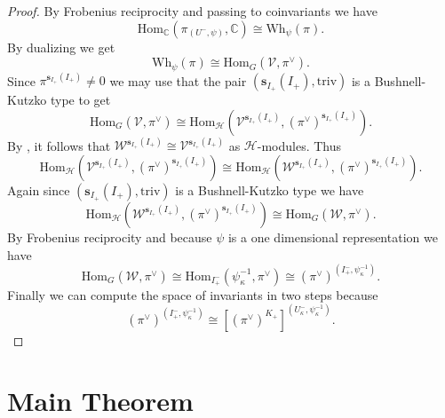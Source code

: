 \documentclass[11pt]{amsart}
\theoremstyle{plain}
\theoremstyle{definition}
\numberwithin{equation}{section}
\newcommand{\C}{\mathbb{C}}
\newcommand{\s}{\mathbf{s}}
\newcommand{\Hcal}{\mathcal{H}}
\begin{document}
\begin{proof}
    By Frobenius reciprocity and passing to coinvariants we have
    \begin{equation*}
        \mathrm{Hom}_{\C}(\pi_{(U^{-},\psi)},\C)\cong \mathrm{Wh}_{\psi}(\pi).
    \end{equation*}
    By dualizing we get
    \begin{equation*}
        \mathrm{Wh}_{\psi}(\pi)\cong \mathrm{Hom}_{G}(\mathcal{V},\pi^{\vee}).
    \end{equation*}
    Since $\pi^{\s_{I_{+}}(I_{+})}\neq 0$ we may use that the pair $(\s_{I_{+}}(I_{+}),\mathrm{triv})$ is a Bushnell-Kutzko type \cite[Lemma 5.8]{GGK24} to get
    \begin{equation*}
        \mathrm{Hom}_{G}(\mathcal{V},\pi^{\vee})\cong \mathrm{Hom}_{\Hcal}(\mathcal{V}^{\s_{I_{+}}(I_{+})},(\pi^{\vee})^{\s_{I_{+}}(I_{+})}).
    \end{equation*}
    By \cite[Lemmas 5.1-5.3]{GGK24}, it follows that $\mathcal{W}^{\s_{I_{+}}(I_{+})}\cong \mathcal{V}^{\s_{I_{+}}(I_{+})}$ as $\Hcal$-modules. Thus 
    \begin{equation*}
        \mathrm{Hom}_{\Hcal}(\mathcal{V}^{\s_{I_{+}}(I_{+})},(\pi^{\vee})^{\s_{I_{+}}(I_{+})})\cong \mathrm{Hom}_{\Hcal}(\mathcal{W}^{\s_{I_{+}}(I_{+})},(\pi^{\vee})^{\s_{I_{+}}(I_{+})}).
    \end{equation*}
    Again since $(\s_{I_{+}}(I_{+}),\mathrm{triv})$ is a Bushnell-Kutzko type we have 
    \begin{equation*}
        \mathrm{Hom}_{\Hcal}(\mathcal{W}^{\s_{I_{+}}(I_{+})},(\pi^{\vee})^{\s_{I_{+}}(I_{+})})\cong \mathrm{Hom}_{G}(\mathcal{W},\pi^{\vee}).
    \end{equation*}
    By Frobenius reciprocity and because $\psi$ is a one dimensional representation we have
    \begin{equation*}
        \mathrm{Hom}_{G}(\mathcal{W},\pi^{\vee})\cong \mathrm{Hom}_{I^{-}_{+}}(\psi_{\kappa}^{-1},\pi^{\vee})\cong (\pi^{\vee})^{(I^{-}_{+},\psi_{\kappa}^{-1})}.
    \end{equation*}
    Finally we can compute the space of invariants in two steps because
    \begin{equation*}
        (\pi^{\vee})^{(I^{-}_{+},\psi_{\kappa}^{-1})}\cong [(\pi^{\vee})^{K_{+}}]^{(U^{-}_{\kappa},\psi_{\kappa}^{-1})}.
    \end{equation*}
\end{proof}

\section{Main Theorem}
\end{document}
